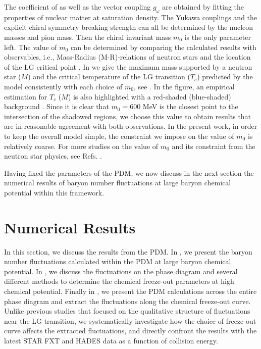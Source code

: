 \documentclass[aps,twocolumn,prd,superscriptaddress,nofootinbib,floatfix]{revtex4-2}
\begin{document}
The coefficient of  as well as the vector coupling $g_\omega$ are obtained by fitting the properties of nuclear matter at saturation density. The Yukawa couplings and the explicit chiral symmetry breaking strength can all be determined by the nucleon masses and pion mass. Then the chiral invariant mass $m_0$ is the only parameter left. The value of $m_0$ can be determined by comparing the calculated results with observables, i.e., Mass-Radius (M-R)-relations of neutron stars and the location of the LG critical point \cite{Karnaukhov:2008be}. In  we give the maximum mass supported by a neutron star ($M$) and the critical temperature of the LG transition ($T_c$) predicted by the model consistently with each choice of $m_0$, see \cite{Recchi:2025pyy}. In the figure, an empirical estimation for $T_c$ ($M$) is also highlighted with a red-shaded (blue-shaded) background \cite{Karnaukhov:2008be}. Since it is clear that $m_0=600$ MeV is the closest point to the intersection of the shadowed regions, we choose this value to obtain results that are in reasonable agreement with both observations. In the present work, in order to keep the overall model simple, the constraint we impose on the value of $m_0$ is relatively coarse. For more studies on the value of $m_0$ and its constraint from the neutron star physics, see Refs. \cite{Minamikawa:2023eky,Gao:2024chh,Gao:2025vdc,Gao:2025nkg}.

Having fixed the parameters of the PDM, we now discuss in the next section the numerical results of baryon number fluctuations at large baryon chemical potential within this framework.
\section{Numerical Results}
\label{sec:result}
In this section, we discuss the results from the PDM. In , we present the baryon number fluctuations calculated within the PDM at large baryon chemical potential. In , we discuss the fluctuations on the phase diagram and several different methods to determine the chemical freeze-out parameters at high chemical potential. Finally in , we present the PDM calculations across the entire phase diagram and extract the fluctuations along the chemical freeze-out curve. Unlike previous studies that focused on the qualitative structure of fluctuations near the LG transition, we systematically investigate how the choice of freeze-out curve affects the extracted fluctuations, and directly confront the results with the latest STAR FXT and HADES data as a function of collision energy.
\end{document}
